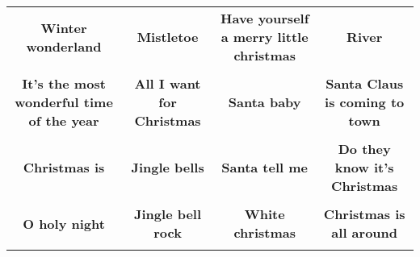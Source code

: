 \documentclass[12pt]{article} \usepackage{eso-pic, graphicx}
\newcommand{\background}[1]{%
\AddToShipoutPictureBG*{\texttt{[image: \#1]}}
}
\begin{document}
\tabcolsep=30.2pt \renewcommand{\arraystretch}{4.5}   \vspace*{4.3cm} \begin{center}  \begin{tabular}{c c c c}
\parbox{3cm}{\centering \textbf{Winter wonderland}}& 
\parbox{3cm}{\centering \textbf{Mistletoe}}& 
\parbox{3cm}{\centering \textbf{Have yourself a merry little christmas}}& 
\parbox{3cm}{\centering \textbf{River}}\\ \\ 
\parbox{3cm}{\centering \textbf{It’s the most wonderful time of the year}}& 
\parbox{3cm}{\centering \textbf{All I want for Christmas}}& 
\parbox{3cm}{\centering \textbf{Santa baby}}& 
\parbox{3cm}{\centering \textbf{Santa Claus is coming to town}}\\ \\ 
\parbox{3cm}{\centering \textbf{Christmas is}}& 
\parbox{3cm}{\centering \textbf{Jingle bells}}& 
\parbox{3cm}{\centering \textbf{Santa tell me}}& 
\parbox{3cm}{\centering \textbf{Do they know it's Christmas}}\\ \\ 
\parbox{3cm}{\centering \textbf{O holy night}}& 
\parbox{3cm}{\centering \textbf{Jingle bell rock}}& 
\parbox{3cm}{\centering \textbf{White christmas}}& 
\parbox{3cm}{\centering \textbf{Christmas is all around}}\\ \\ 
\end{tabular} \background{discobingo.pdf} \end{center} 
\end{document}
